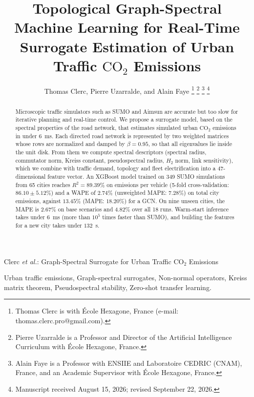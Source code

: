 \documentclass[journal]{IEEEtran}
\begin{document}
\title{Topological Graph-Spectral Machine Learning for Real-Time Surrogate Estimation of Urban Traffic $\text{CO}_2$ Emissions}

\author{Thomas Clerc, Pierre Uzarralde, and Alain Faye%
\thanks{Thomas Clerc is with \'Ecole Hexagone, France (e-mail: thomas.clerc.pro@gmail.com).}%
\thanks{Pierre Uzarralde is a Professor and Director of the Artificial Intelligence Curriculum with \'Ecole Hexagone, France.}%
\thanks{Alain Faye is a Professor with ENSIIE and Laboratoire CEDRIC (CNAM), France, and an Academic Supervisor with \'Ecole Hexagone, France.}%
\thanks{Manuscript received August 15, 2026; revised September 22, 2026.}}

%
{Clerc \MakeLowercase{\textit{et al.}}: Graph-Spectral Surrogate for Urban Traffic $\text{CO}_2$ Emissions}

\maketitle

\begin{abstract}
Microscopic traffic simulators such as SUMO and Aimsun are accurate but too slow for iterative planning and real-time control. We propose a surrogate model, based on the spectral properties of the road network, that estimates simulated urban $\text{CO}_2$ emissions in under $6$~ms. Each directed road network is represented by two weighted matrices whose rows are normalized and damped by $\beta = 0.95$, so that all eigenvalues lie inside the unit disk. From them we compute spectral descriptors (spectral radius, commutator norm, Kreiss constant, pseudospectral radius, $H_2$ norm, link sensitivity), which we combine with traffic demand, topology and fleet electrification into a 47-dimensional feature vector. An XGBoost model trained on 349 SUMO simulations from 65 cities reaches $R^2 = 89.39\%$ on emissions per vehicle (5-fold cross-validation: $86.10 \pm 5.12\%$) and a WAPE of $2.74\%$ (unweighted MAPE: $7.28\%$) on total city emissions, against $13.45\%$ (MAPE: $18.20\%$) for a GCN. On nine unseen cities, the MAPE is $2.67\%$ on base scenarios and $4.82\%$ over all 18 runs. Warm-start inference takes under $6$~ms (more than $10^5$ times faster than SUMO), and building the features for a new city takes under $132$~s.
\end{abstract}

\begin{IEEEkeywords}
Urban traffic emissions, Graph-spectral surrogates, Non-normal operators, Kreiss matrix theorem, Pseudospectral stability, Zero-shot transfer learning.
\end{IEEEkeywords}
\end{document}
